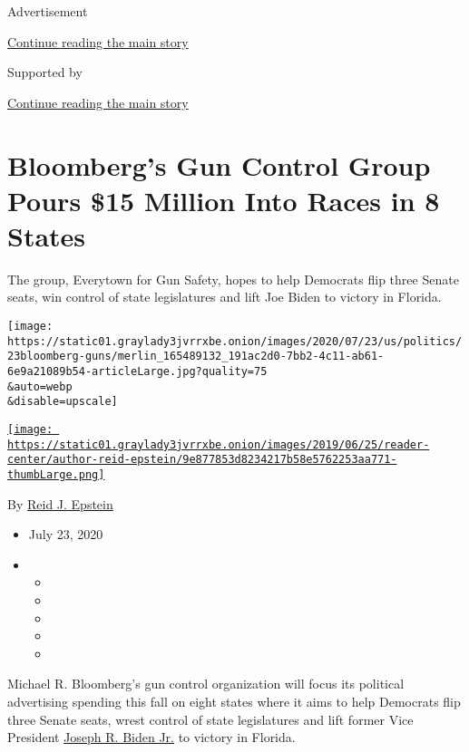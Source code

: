 Advertisement

\protect\hyperlink{after-top}{Continue reading the main story}

Supported by

\protect\hyperlink{after-sponsor}{Continue reading the main story}

\hypertarget{bloombergs-gun-control-group-pours-15-million-into-races-in-8-states}{%
\section{Bloomberg's Gun Control Group Pours \$15 Million Into Races in
8
States}\label{bloombergs-gun-control-group-pours-15-million-into-races-in-8-states}}

The group, Everytown for Gun Safety, hopes to help Democrats flip three
Senate seats, win control of state legislatures and lift Joe Biden to
victory in Florida.

\texttt{[image: https://static01.graylady3jvrrxbe.onion/images/2020/07/23/us/politics/23bloomberg-guns/merlin\_165489132\_191ac2d0-7bb2-4c11-ab61-6e9a21089b54-articleLarge.jpg?quality=75\\\&auto=webp\\\&disable=upscale]}

\href{https://www.nytimes3xbfgragh.onion/by/reid-j-epstein}{\texttt{[image: https://static01.graylady3jvrrxbe.onion/images/2019/06/25/reader-center/author-reid-epstein/9e877853d8234217b58e5762253aa771-thumbLarge.png]}}

By \href{https://www.nytimes3xbfgragh.onion/by/reid-j-epstein}{Reid J.
Epstein}

\begin{itemize}
\item
  July 23, 2020
\item
  \begin{itemize}
  \item
  \item
  \item
  \item
  \item
  \end{itemize}
\end{itemize}

Michael R. Bloomberg's gun control organization will focus its political
advertising spending this fall on eight states where it aims to help
Democrats flip three Senate seats, wrest control of state legislatures
and lift former Vice President
\href{https://www.nytimes3xbfgragh.onion/interactive/2020/us/elections/joe-biden.html}{Joseph
R. Biden Jr.} to victory in Florida.

